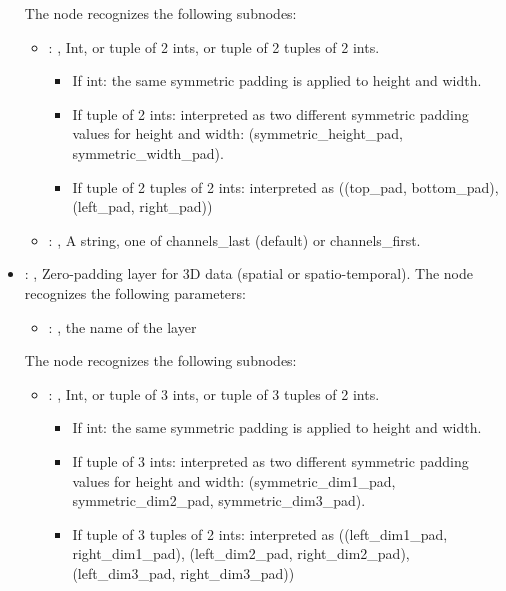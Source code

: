 \begin{itemize}
      The  node recognizes the following subnodes:
      \begin{itemize}
        \item {}: , 
          Int, or tuple of 2 ints, or tuple of 2 tuples of 2 ints.         \begin{itemize}
          \item If int: the same symmetric padding is applied to height and width.           \item
          If tuple of 2 ints: interpreted as two different symmetric padding values for height and
          width:           (symmetric\_height\_pad, symmetric\_width\_pad).           \item If tuple
          of 2 tuples of 2 ints: interpreted as ((top\_pad, bottom\_pad), (left\_pad, right\_pad))
          \end{itemize}

        \item {}: , 
          A string, one of channels\_last (default) or channels\_first.
      \end{itemize}

    \item {}: , 
      Zero-padding layer for 3D data (spatial or spatio-temporal).
      The  node recognizes the following parameters:
        \begin{itemize}
          \item {}: , 
            the name of the layer
      \end{itemize}

      The  node recognizes the following subnodes:
      \begin{itemize}
        \item {}: , 
          Int, or tuple of 3 ints, or tuple of 3 tuples of 2 ints.         \begin{itemize}
          \item If int: the same symmetric padding is applied to height and width.           \item
          If tuple of 3 ints: interpreted as two different symmetric padding values for height and
          width:           (symmetric\_dim1\_pad, symmetric\_dim2\_pad, symmetric\_dim3\_pad).
          \item If tuple of 3 tuples of 2 ints: interpreted as ((left\_dim1\_pad, right\_dim1\_pad),
          (left\_dim2\_pad, right\_dim2\_pad), (left\_dim3\_pad, right\_dim3\_pad))
          \end{itemize}


\end{itemize}
\end{itemize}
